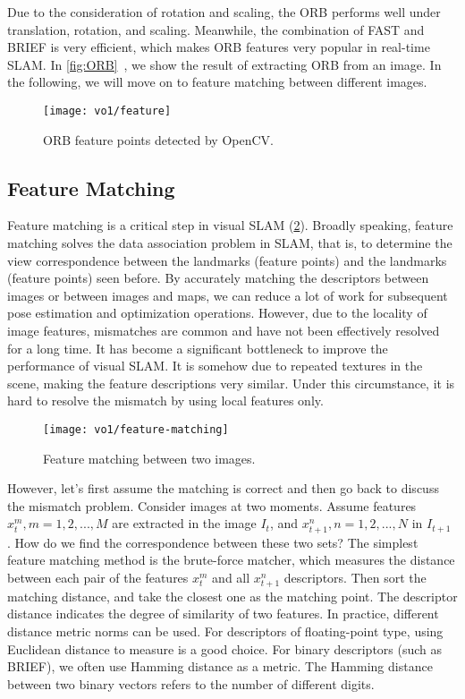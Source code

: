 Due to the consideration of rotation and scaling, the ORB performs well under translation, rotation, and scaling. Meanwhile, the combination of FAST and BRIEF is very efficient, which makes ORB features very popular in real-time SLAM. In \autoref{fig:ORB}~, we show the result of extracting ORB from an image. In the following, we will move on to feature matching between different images.

\begin{figure}[!htp]
    \centering
    \texttt{[image: vo1/feature]}\\
    \caption{ORB feature points detected by OpenCV.}
    \label{fig:ORB}
\end{figure}

\subsection{Feature Matching}

Feature matching is a critical step in visual SLAM (\ref{fig:feature-matching}). Broadly speaking, feature matching solves the data association problem in SLAM, that is, to determine the view correspondence between the landmarks (feature points) and the landmarks (feature points) seen before. By accurately matching the descriptors between images or between images and maps, we can reduce a lot of work for subsequent pose estimation and optimization operations. However, due to the locality of image features, mismatches are common and have not been effectively resolved for a long time. It has become a significant bottleneck to improve the performance of visual SLAM. It is somehow due to repeated textures in the scene, making the feature descriptions very similar. Under this circumstance, it is hard to resolve the mismatch by using local features only.

\begin{figure}[!htp]
    \centering
    \texttt{[image: vo1/feature-matching]}
    \caption{Feature matching between two images.}
    \label{fig:feature-matching}
\end{figure}

However, let's first assume the matching is correct and then go back to discuss the mismatch problem. Consider images at two moments. Assume features $x_{t}^{m}, m=1,2,...,M$ are extracted in the image $I_{t}$, and $x_{t+1}^{n}, n=1,2,...,N$ in $I_{t+1}$ . How do we find the correspondence between these two sets? The simplest feature matching method is the brute-force matcher, which measures the distance between each pair of the features $x_{t}^{m}$ and all $x_{t+1}^{n}$ descriptors. Then sort the matching distance, and take the closest one as the matching point. The descriptor distance indicates the degree of similarity of two features. In practice, different distance metric norms can be used. For descriptors of floating-point type, using Euclidean distance to measure is a good choice. For binary descriptors (such as BRIEF), we often use Hamming distance as a metric. The Hamming distance between two binary vectors refers to the number of different digits.

